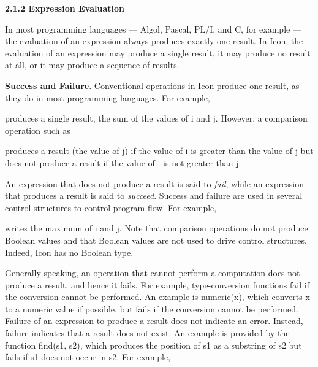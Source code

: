 {\sffamily\bfseries
2.1.2 Expression Evaluation}


In most programming languages --- Algol, Pascal, PL/I, and C, for
example --- the evaluation of an expression always produces exactly
one result. In Icon, the evaluation of an expression may produce a
single result, it may produce no result at all, or it may produce a
sequence of results.

\textbf{Success and Failure}. Conventional operations in Icon
produce one result, as they do in most programming languages. For
example,



\noindent produces a single result, the sum of the values of i and
j. However, a comparison operation such as



\noindent produces a result (the value of j) if the value of i is
greater than the value of j but does not produce a result if the value
of i is not greater than j.

An expression that does not produce a result is said to \textit{fail},
while an expression that produces a result is said to
\textit{succeed}. Success and failure are used in several control
structures to control program flow. For example,



\noindent writes the maximum of i and j. Note that comparison
operations do not produce Boolean values and that Boolean values are
not used to drive control structures. Indeed, Icon has no Boolean
type.

Generally speaking, an operation that cannot perform a computation
does not produce a result, and hence it fails. For example,
type-conversion functions fail if the conversion cannot be
performed. An example is numeric(x), which converts x to a numeric
value if possible, but fails if the conversion cannot be
performed. Failure of an expression to produce a result does not
indicate an error. Instead, failure indicates that a result does not
exist. An example is provided by the function find(s1, s2), which
produces the position of s1 as a substring of s2 but fails if s1 does
not occur in s2.  For example,



